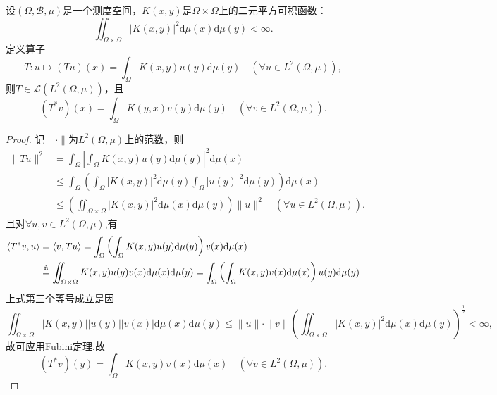 \documentclass[../../main.tex]{subfiles}%
\begin{document}
\begin{example}
设$(\Omega,\mathscr{B},\mu)$是一个测度空间，$K(x,y)$是$\Omega\times\Omega$上的二元平方可积函数：
\[
\iint_{\Omega\times\Omega}|K(x,y)|^2\mathrm{d}\mu(x)\mathrm{d}\mu(y)<\infty.
\]
定义算子
\[
T:u\mapsto (Tu)(x)=\int_{\Omega}K(x,y)u(y)\mathrm{d}\mu(y)\quad (\forall u\in L^2(\Omega,\mu)),
\]
则$T\in\mathscr{L}(L^2(\Omega,\mu))$，且
\[
(T^*v)(x)=\int_{\Omega}K(y,x)v(y)\mathrm{d}\mu(y)\quad (\forall v\in L^2(\Omega,\mu)).
\]
\end{example}

\begin{proof}

记$\|\cdot\|$为$L^2(\Omega,\mu)$上的范数，则
\begin{align*}
\|Tu\|^2&=\int_{\Omega}\left|\int_{\Omega}K(x,y)u(y)\mathrm{d}\mu(y)\right|^2\mathrm{d}\mu(x)\\
&\leqslant\int_{\Omega}\left(\int_{\Omega}|K(x,y)|^2\mathrm{d}\mu(y)\int_{\Omega}|u(y)|^2\mathrm{d}\mu(y)\right)\mathrm{d}\mu(x)\\
&\leqslant\left(\iint_{\Omega\times\Omega}|K(x,y)|^2\mathrm{d}\mu(x)\mathrm{d}\mu(y)\right)\|u\|^2\quad (\forall u\in L^2(\Omega,\mu)).
\end{align*}
且对$\forall u,v\in L^2(\Omega,\mu)$,有
\begin{align*}
\langle T^*v,u\rangle&=\langle v,Tu\rangle
=\int_{\Omega}\left(\int_{\Omega}K(x,y)u(y)\mathrm{d}\mu(y)\right)v(x)\mathrm{d}\mu(x)\\
&\stackrel{\one}{=}\iint_{\Omega\times\Omega}K(x,y)u(y)v(x)\mathrm{d}\mu(x)\mathrm{d}\mu(y)
=\int_{\Omega}\left(\int_{\Omega}K(x,y)v(x)\mathrm{d}\mu(x)\right)u(y)\mathrm{d}\mu(y)
\end{align*}
上式第三个等号成立是因
\[
\iint_{\Omega\times\Omega}|K(x,y)||u(y)||v(x)|\mathrm{d}\mu(x)\mathrm{d}\mu(y)\leqslant\|u\|\cdot\|v\|\left(\iint_{\Omega\times\Omega}|K(x,y)|^2\mathrm{d}\mu(x)\mathrm{d}\mu(y)\right)^{\frac{1}{2}}<\infty,
\]
故可应用Fubini定理.故
\[
(T^*v)(y)=\int_{\Omega}K(x,y)v(x)\mathrm{d}\mu(x)\quad (\forall v\in L^2(\Omega,\mu)).
\]

\end{proof}
\end{document}
